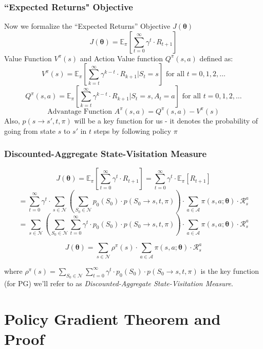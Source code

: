 \documentclass[handout]{beamer}
\begin{document}
\begin{frame}
\frametitle{``Expected Returns" Objective}
\pause
Now we formalize the ``Expected Returns'' Objective $J(\bm{\theta})$
$$J(\bm{\theta}) = \mathbb{E}_{\pi}[\sum_{t=0}^\infty \gamma^t \cdot R_{t+1}]$$
\pause
Value Function $V^{\pi}(s)$ and Action Value function $Q^{\pi}(s,a)$ defined as:
$$V^{\pi}(s) = \mathbb{E}_{\pi}[\sum_{k=t}^\infty \gamma^{k-t} \cdot R_{k+1} | S_t=s] \text{ for all } t = 0, 1, 2, \ldots$$
$$Q^{\pi}(s,a) = \mathbb{E}_{\pi}[\sum_{k=t}^\infty \gamma^{k-t} \cdot R_{k+1} | S_t=s, A_t=a] \text{ for all } t = 0, 1, 2, \ldots$$
\pause
$$\mbox{Advantage Function } A^{\pi}(s,a) = Q^{\pi}(s,a) - V^{\pi}(s)$$
\pause
Also, $p(s \rightarrow s', t, \pi)$ will be a key function for us - it denotes the probability of going from state $s$ to $s'$ in $t$ steps by following policy $\pi$
\end{frame}

\begin{frame}
\frametitle{Discounted-Aggregate State-Visitation Measure}
\pause
$$J(\bm{\theta}) = \mathbb{E}_{\pi}[\sum_{t=0}^\infty \gamma^t \cdot R_{t+1}] = \sum_{t=0}^\infty \gamma^t \cdot \mathbb{E}_{\pi}[R_{t+1}]$$
\pause
$$ = \sum_{t=0}^\infty \gamma^t \cdot \sum_{s \in \mathcal{N}} (\sum_{S_0 \in \mathcal{N}}  p_0(S_0) \cdot p(S_0 \rightarrow s, t, \pi)) \cdot \sum_{a \in \mathcal{A}} \pi(s,a; \bm{\theta}) \cdot \mathcal{R}_s^a$$
\pause
$$ =  \sum_{s \in \mathcal{N}} (\sum_{S_0 \in \mathcal{N}}  \sum_{t=0}^\infty \gamma^t \cdot p_0(S_0) \cdot p(S_0 \rightarrow s, t, \pi)) \cdot \sum_{a \in \mathcal{A}} \pi(s,a; \bm{\theta}) \cdot \mathcal{R}_s^a$$
\pause
\begin{definition}
$$J(\bm{\theta}) =  \sum_{s \in \mathcal{N}} \rho^{\pi}(s) \cdot \sum_{a \in \mathcal{A}} \pi(s,a; \bm{\theta}) \cdot \mathcal{R}_s^a$$
\end{definition}
\pause
where $\rho^{\pi}(s) = \sum_{S_0 \in \mathcal{N}}  \sum_{t=0}^\infty \gamma^t \cdot p_0(S_0) \cdot p(S_0 \rightarrow s, t, \pi)$ is the key function (for PG) we'll refer to as {\em Discounted-Aggregate State-Visitation Measure}.
\end{frame}

\section{Policy Gradient Theorem and Proof}
\end{document}
